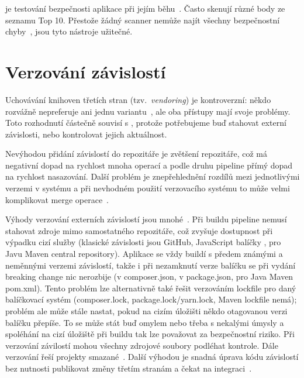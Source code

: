          je testování bezpečnosti aplikace při jejím běhu~\cite{dast}. Často skenují různé body ze seznamu  Top 10. Přestože žádný scanner nemůže najít všechny bezpečnostní chyby~\cite{netsparker-scanner}, jsou tyto nástroje užitečné.

    \section*{Verzování závislostí}
        Uchovávání knihoven třetích stran (tzv.~\textit{vendoring}) je kontroverzní: někdo rozvážně nepreferuje ani jednu variantu~\cite{copes-commit-npm}, ale oba přístupy mají svoje problémy. Toto rozhodnutí částečně souvisí s \CI, protože potřebujeme buď stahovat externí závislosti, nebo kontrolovat jejich aktuálnost.


        Nevýhodou přidání závislostí do repozitáře je zvětšení repozitáře, což má negativní dopad na rychlost mnoha operací a podle druhu \CICD pipeline přímý dopad na rychlost nasazování. Další problém je znepřehlednění rozdílů mezi jednotlivými verzemi v systému a při nevhodném použití verzovacího systému to může velmi komplikovat merge operace~\cite{should-i-vendor}.

        Výhody verzování externích závislostí jsou mnohé~\cite{andrawos2017cloud}. Při buildu \CICD pipeline nemusí stahovat zdroje mimo samostatného repozitáře, což zvyšuje dostupnost při výpadku cizí služby (klasické závislosti jsou GitHub, JavaScript balíčky , pro Javu Maven central repository). Aplikace se vždy buildí s předem známými a neměnnými verzemi závislostí, takže i při nezamknutí verze balíčku se při vydání breaking change nic nerozbije (v  composer.json, v  package.json, pro Java Maven pom.xml). Tento problém lze alternativně také řešit verzováním lockfile pro daný balíčkovací systém (composer.lock, package.lock/yarn.lock, Maven lockfile nemá); problém ale může stále nastat, pokud na cizím úložišti někdo otagovanou verzi balíčku přepíše. To se může stát buď omylem nebo třeba s nekalými úmysly a spoléhání na cizí úložiště při buildu tak lze považovat za bezpečnostní riziko. Při verzování závilostí mohou všechny zdrojové soubory podléhat kontrole. Dále verzování řeší projekty smazané~\cite{williams-left-pad}. Další výhodou je snadná úprava kódu závislostí bez nutnosti publikovat změny třetím stranám a čekat na integraci~\cite{rusnavcko2014fedora}.
